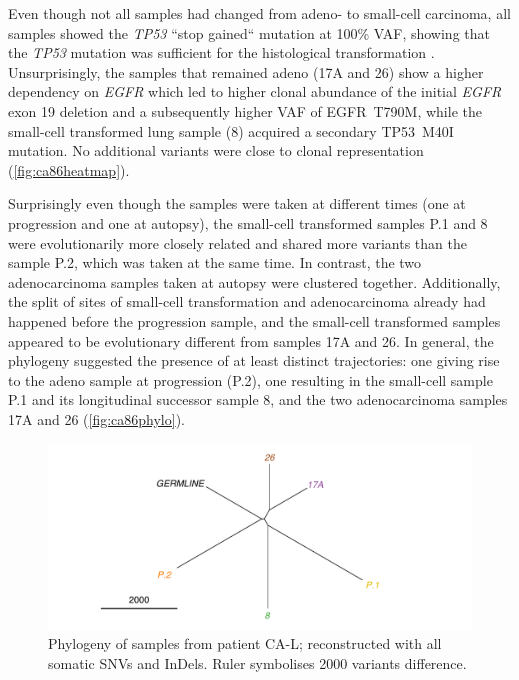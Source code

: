 Even though not all samples had changed from adeno- to small-cell carcinoma, all samples showed the \textit{TP53} ``stop gained`` mutation at 100\% VAF, showing that the  \textit{TP53} mutation was sufficient for the histological transformation \cite{Offin2019}. Unsurprisingly, the samples that remained adeno (17A and 26) show a higher dependency on \textit{EGFR} which led to  higher clonal abundance of the initial \textit{EGFR} exon 19 deletion and a subsequently higher VAF of EGFR~T790M, while the small-cell transformed lung sample (8) acquired a secondary TP53~M40I mutation. No additional variants were close to clonal representation (\autoref{fig:ca86heatmap}).

Surprisingly even though the samples were taken at different times (one at progression and one at autopsy), the small-cell transformed samples P.1 and 8 were evolutionarily more closely related and shared more variants than  the sample P.2, which was taken at the same time. In contrast, the two adenocarcinoma samples taken at autopsy were clustered together. Additionally, the split of sites of small-cell transformation and adenocarcinoma  already had happened before the progression sample, and the small-cell transformed samples appeared to be evolutionary different from samples 17A and 26. In general, the phylogeny suggested the presence of at least  distinct trajectories: one giving rise to the adeno sample at progression (P.2), one resulting in the small-cell sample P.1 and its longitudinal successor sample 8, and  the two adenocarcinoma samples 17A and 26 (\autoref{fig:ca86phylo}).

\begin{figure}[ht]
	\centering
	\includegraphics[width=.99\linewidth]{Figures/CASCADE/CA86/CA86phylo.pdf}
	\caption[Phylogeny of autopsy samples from patient CA-L]{Phylogeny of samples from patient CA-L; reconstructed with all somatic SNVs and InDels. Ruler symbolises 2000 variants difference.} \label{fig:ca86phylo}
\end{figure}


